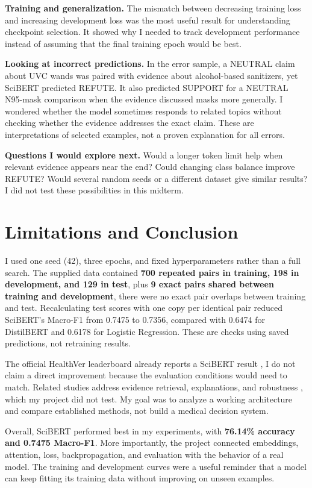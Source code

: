 \documentclass[11pt,letterpaper]{article}
\begin{document}
\textbf{Training and generalization.} The mismatch between decreasing training loss and increasing development loss was the most useful result for understanding checkpoint selection. It showed why I needed to track development performance instead of assuming that the final training epoch would be best.

\textbf{Looking at incorrect predictions.} In the error sample, a NEUTRAL claim about UVC wands was paired with evidence about alcohol-based sanitizers, yet SciBERT predicted REFUTE. It also predicted SUPPORT for a NEUTRAL N95-mask comparison when the evidence discussed masks more generally. I wondered whether the model sometimes responds to related topics without checking whether the evidence addresses the exact claim. These are interpretations of selected examples, not a proven explanation for all errors.

\textbf{Questions I would explore next.} Would a longer token limit help when relevant evidence appears near the end? Could changing class balance improve REFUTE? Would several random seeds or a different dataset give similar results? I did not test these possibilities in this midterm.

\section{Limitations and Conclusion}
I used one seed (42), three epochs, and fixed hyperparameters rather than a full search. The supplied data contained \textbf{700 repeated pairs in training, 198 in development, and 129 in test}, plus \textbf{9 exact pairs shared between training and development}, there were no exact pair overlaps between training and test. Recalculating test scores with one copy per identical pair reduced SciBERT's Macro-F1 from 0.7475 to 0.7356, compared with 0.6474 for DistilBERT and 0.6178 for Logistic Regression. These are checks using saved predictions, not retraining results.

The official HealthVer leaderboard already reports a SciBERT result \cite{repo}, I do not claim a direct improvement because the evaluation conditions would need to match. Related studies address evidence retrieval, explanations, and robustness \cite{wadden2020,wadden2022,schuster}, which my project did not test. My goal was to analyze a working architecture and compare established methods, not build a medical decision system.

Overall, SciBERT performed best in my experiments, with \textbf{76.14\% accuracy and 0.7475 Macro-F1}. More importantly, the project connected embeddings, attention, loss, backpropagation, and evaluation with the behavior of a real model. The training and development curves were a useful reminder that a model can keep fitting its training data without improving on unseen examples.
\end{document}
